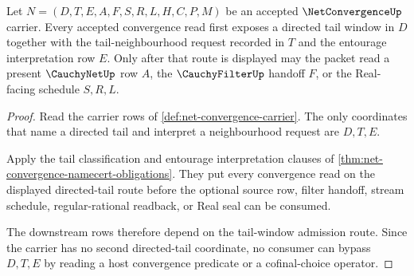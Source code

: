 \begin{theorem}
\label{thm:netconvergence-tail-window-admission}
Let $N=(D,T,E,A,F,S,R,L,H,C,P,M)$ be an accepted $\NetConvergenceUp$ carrier. Every accepted convergence read first exposes a directed tail window in $D$ together with the tail-neighbourhood request recorded in $T$ and the entourage interpretation row $E$. Only after that route is displayed may the packet read a present $\CauchyNetUp$ row $A$, the $\CauchyFilterUp$ handoff $F$, or the Real-facing schedule $S,R,L$.
\end{theorem}
\begin{proof}
Read the carrier rows of \autoref{def:net-convergence-carrier}. The only coordinates that name a directed tail and interpret a neighbourhood request are $D,T,E$.

Apply the tail classification and entourage interpretation clauses of \autoref{thm:net-convergence-namecert-obligations}. They put every convergence read on the displayed directed-tail route before the optional source row, filter handoff, stream schedule, regular-rational readback, or Real seal can be consumed.

The downstream rows therefore depend on the tail-window admission route. Since the carrier has no second directed-tail coordinate, no consumer can bypass $D,T,E$ by reading a host convergence predicate or a cofinal-choice operator.
\end{proof}

